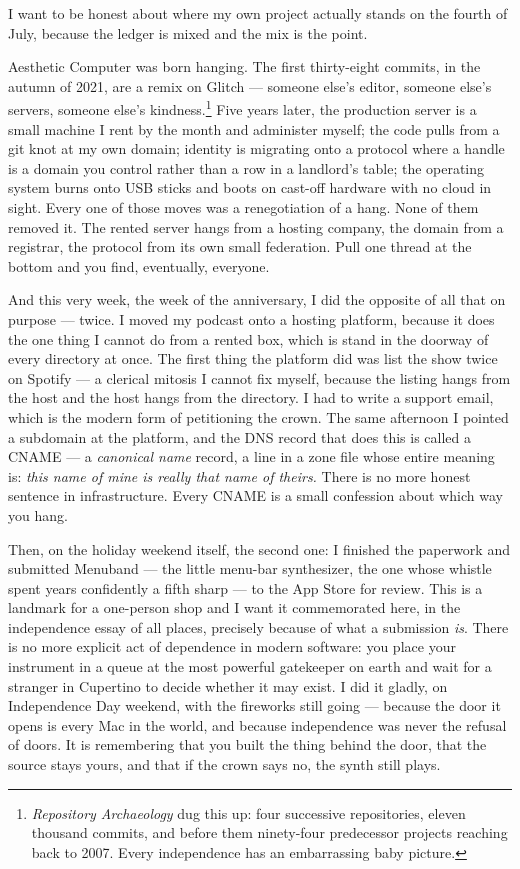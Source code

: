 \documentclass[11pt,letterpaper]{article}
\begin{document}
I want to be honest about where my own project actually stands on the fourth of July, because the ledger is mixed and the mix is the point.

Aesthetic Computer was born hanging. The first thirty-eight commits, in the autumn of 2021, are a remix on Glitch --- someone else's editor, someone else's servers, someone else's kindness.\footnote{\textit{Repository Archaeology} dug this up: four successive repositories, eleven thousand commits, and before them ninety-four predecessor projects reaching back to 2007. Every independence has an embarrassing baby picture.} Five years later, the production server is a small machine I rent by the month and administer myself; the code pulls from a git knot at my own domain; identity is migrating onto a protocol where a handle is a domain you control rather than a row in a landlord's table; the operating system burns onto USB sticks and boots on cast-off hardware with no cloud in sight. Every one of those moves was a renegotiation of a hang. None of them removed it. The rented server hangs from a hosting company, the domain from a registrar, the protocol from its own small federation. Pull one thread at the bottom and you find, eventually, everyone.

And this very week, the week of the anniversary, I did the opposite of all that on purpose --- twice. I moved my podcast onto a hosting platform, because it does the one thing I cannot do from a rented box, which is stand in the doorway of every directory at once. The first thing the platform did was list the show twice on Spotify --- a clerical mitosis I cannot fix myself, because the listing hangs from the host and the host hangs from the directory. I had to write a support email, which is the modern form of petitioning the crown. The same afternoon I pointed a subdomain at the platform, and the DNS record that does this is called a CNAME --- a \textit{canonical name} record, a line in a zone file whose entire meaning is: \textit{this name of mine is really that name of theirs.} There is no more honest sentence in infrastructure. Every CNAME is a small confession about which way you hang.

Then, on the holiday weekend itself, the second one: I finished the paperwork and submitted Menuband --- the little menu-bar synthesizer, the one whose whistle spent years confidently a fifth sharp --- to the App Store for review. This is a landmark for a one-person shop and I want it commemorated here, in the independence essay of all places, precisely because of what a submission \textit{is}. There is no more explicit act of dependence in modern software: you place your instrument in a queue at the most powerful gatekeeper on earth and wait for a stranger in Cupertino to decide whether it may exist. I did it gladly, on Independence Day weekend, with the fireworks still going --- because the door it opens is every Mac in the world, and because independence was never the refusal of doors. It is remembering that you built the thing behind the door, that the source stays yours, and that if the crown says no, the synth still plays.
\end{document}
